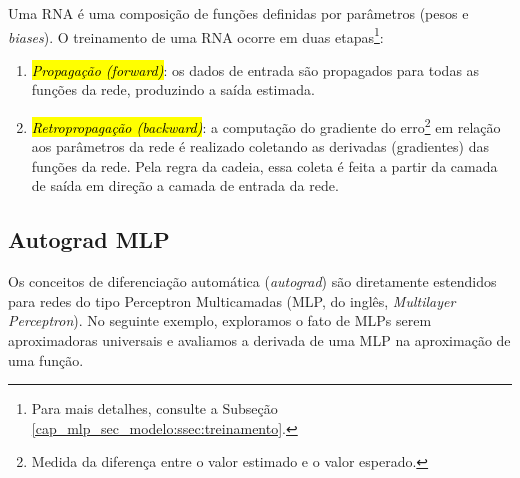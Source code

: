 Uma RNA é uma composição de funções definidas por parâmetros (pesos e \textit{biases}). O treinamento de uma RNA ocorre em duas etapas\footnote{Para mais detalhes, consulte a Subseção \ref{cap_mlp_sec_modelo:ssec:treinamento}.}:
\begin{enumerate}[1.]
\item \hl{\emph{Propagação (\textit{forward})}}: os dados de entrada são propagados para todas as funções da rede, produzindo a saída estimada.
\item \hl{\emph{Retropropagação (\textit{backward})}}: a computação do gradiente do erro\footnote{Medida da diferença entre o valor estimado e o valor esperado.} em relação aos parâmetros da rede é realizado coletando as derivadas (gradientes) das funções da rede. Pela regra da cadeia, essa coleta é feita a partir da camada de saída em direção a camada de entrada da rede.
\end{enumerate}

\subsection{Autograd MLP}

Os conceitos de diferenciação automática (\emph{autograd}) são diretamente estendidos para redes do tipo Perceptron Multicamadas (MLP, do inglês, \textit{Multilayer Perceptron}). No seguinte exemplo, exploramos o fato de MLPs serem aproximadoras universais e avaliamos a derivada de uma MLP na aproximação de uma função.

